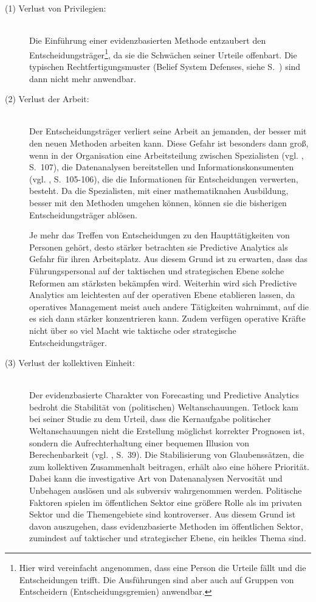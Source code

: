 \begin{description}
\item[(1) Verlust von Privilegien:] \hfill \\
Die Einführung einer evidenzbasierten Methode entzaubert den Entscheidungsträger\footnote{
Hier wird vereinfacht angenommen, dass eine Person die Urteile fällt und die Entscheidungen
trifft. Die Ausführungen sind aber auch auf Gruppen von Entscheidern (Entscheidungsgremien)
anwendbar.
}, da sie die Schwächen seiner Urteile offenbart. Die typischen Rechtfertigungsmuster
(Belief System Defenses, siehe S.~\xcom)
sind dann nicht mehr anwendbar.

\item[(2) Verlust der Arbeit:] \hfill \\
Der Entscheidungsträger verliert seine Arbeit an jemanden, der besser mit den neuen Methoden
arbeiten kann. Diese Gefahr ist besonders dann groß, wenn in der Organisation eine Arbeitsteilung
zwischen Spezialisten (vgl. \cite{Gluchowski}, S.~107), die Datenanalysen bereitstellen und Informationskonsumenten
(vgl. \cite{Gluchowski}, S.~105-106), die die Informationen für Entscheidungen verwerten, besteht. 
Da die Spezialisten, mit einer mathematiknahen Ausbildung, besser mit den Methoden umgehen können, 
können sie die bisherigen Entscheidungsträger ablösen.

Je mehr das Treffen von Entscheidungen zu den Haupttätigkeiten von Personen
gehört, desto stärker betrachten sie Predictive Analytics als Gefahr für ihren
Arbeitsplatz. Aus diesem Grund ist zu erwarten, dass das Führungspersonal auf der taktischen
und strategischen Ebene solche Reformen am stärksten bekämpfen wird. Weiterhin wird sich Predictive
Analytics am leichtesten auf der operativen Ebene etablieren lassen, da operatives Management meist
auch andere Tätigkeiten wahrnimmt, auf die es sich dann stärker konzentrieren kann. Zudem verfügen
operative Kräfte nicht über so viel Macht wie taktische oder strategische Entscheidungsträger.

\item[(3) Verlust der kollektiven Einheit:] \hfill \\
Der evidenzbasierte Charakter von Forecasting und Predictive Analytics bedroht die Stabilität
von (politischen) Weltanschauungen.
Tetlock kam bei seiner Studie zu dem Urteil, dass die Kernaufgabe politischer Weltanschauungen
nicht die Erstellung möglichst korrekter Prognosen ist, sondern die
Aufrechterhaltung einer bequemen Illusion von Berechenbarkeit
(vgl. \cite{Tetlock}, S.~39). Die Stabilisierung von Glaubenssätzen, die zum
kollektiven Zusammenhalt beitragen, erhält also eine höhere Priorität.
Dabei kann die investigative Art von Datenanalysen Nervosität und Unbehagen auslösen und als
subversiv wahrgenommen werden. Politische Faktoren spielen im öffentlichen Sektor eine größere Rolle als
im privaten Sektor und die Themengebiete sind kontroverser. Aus diesem Grund ist davon auszugehen, dass
evidenzbasierte Methoden im öffentlichen Sektor, zumindest auf taktischer und strategischer Ebene,
ein heikles Thema sind. 

\end{description}

